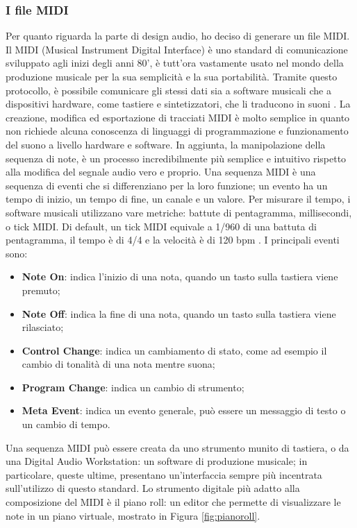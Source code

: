 \subsubsection{I file MIDI}
Per quanto riguarda la parte di design audio, ho deciso di generare un file MIDI.
Il MIDI (Musical Instrument Digital Interface) è uno standard di comunicazione sviluppato agli inizi degli anni 80', è tutt'ora vastamente usato nel mondo della produzione musicale per la sua semplicità e la sua portabilità.
Tramite questo protocollo, è possibile comunicare gli stessi dati sia a software musicali che a dispositivi hardware, come tastiere e sintetizzatori, che li traducono in suoni \cite{midi}.
La creazione, modifica ed esportazione di tracciati MIDI è molto semplice in quanto non richiede alcuna conoscenza di linguaggi di programmazione e funzionamento del suono a livello hardware e software.
In aggiunta, la manipolazione della sequenza di note, è un processo incredibilmente più semplice e intuitivo rispetto alla modifica del segnale audio vero e proprio.
Una sequenza MIDI è una sequenza di eventi che si differenziano per la loro funzione; un evento ha un tempo di inizio, un tempo di fine, un canale e un valore.
Per misurare il tempo, i software musicali utilizzano vare metriche: battute di pentagramma, millisecondi, o tick MIDI.
Di default, un tick MIDI equivale a 1/960 di una battuta di pentagramma, il tempo è di 4/4 e la velocità è di 120 bpm \cite{midi}.
I principali eventi sono:
\begin{itemize}
    \item \textbf{Note On}: indica l'inizio di una nota, quando un tasto sulla tastiera viene premuto;
    \item \textbf{Note Off}: indica la fine di una nota, quando un tasto sulla tastiera viene rilasciato;
    \item \textbf{Control Change}: indica un cambiamento di stato, come ad esempio il cambio di tonalità di una nota mentre suona;
    \item \textbf{Program Change}: indica un cambio di strumento;
    \item \textbf{Meta Event}: indica un evento generale, può essere un messaggio di testo o un cambio di tempo.
\end{itemize}
Una sequenza MIDI può essere creata da uno strumento munito di tastiera, o da una Digital Audio Workstation: un software di produzione musicale; in particolare, queste ultime, presentano un'interfaccia sempre più incentrata sull'utilizzo di questo standard.
Lo strumento digitale più adatto alla composizione del MIDI è il piano roll: un editor che permette di visualizzare le note in un piano virtuale, mostrato in Figura \ref{fig:pianoroll}. 
